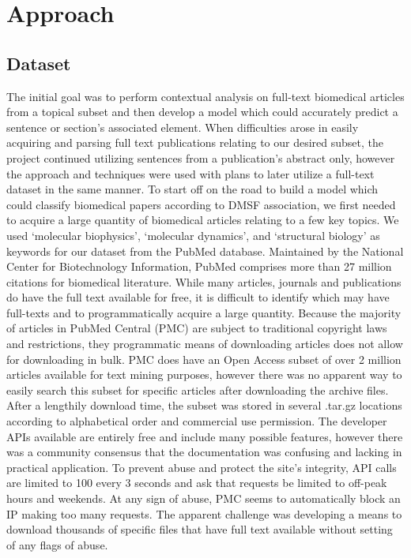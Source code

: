 \documentclass{article} %
\begin{document}
\section{Approach}
\subsection{Dataset}
The initial goal was to perform contextual analysis on full-text biomedical articles from a topical subset and then develop a model which could accurately predict a sentence or section’s associated element. When difficulties arose in easily acquiring and parsing full text publications relating to our desired subset, the project continued utilizing sentences from a publication’s abstract only, however the approach and techniques were used with plans to later utilize a full-text dataset in the same manner. To start off on the road to build a model which could classify biomedical papers according to DMSF association, we first needed to acquire a large quantity of biomedical articles relating to a few key topics. We used ‘molecular biophysics’, ‘molecular dynamics’, and ‘structural biology’ as keywords for our dataset from the PubMed database. Maintained by the National Center for Biotechnology Information, PubMed comprises more than 27 million citations for biomedical literature. While many articles, journals and publications do have the full text available for free, it is difficult to identify which may have full-texts and to programmatically acquire a large quantity. Because the majority of articles in PubMed Central (PMC) are subject to traditional copyright laws and restrictions, they programmatic means of downloading articles does not allow for downloading in bulk. PMC does have an Open Access subset of over 2 million articles available for text mining purposes, however there was no apparent way to easily search this subset for specific articles after downloading the archive files. After a lengthily download time, the subset was stored in several .tar.gz locations according to alphabetical order and commercial use permission. The developer APIs available are entirely free and include many possible features, however there was a community consensus that the documentation was confusing and lacking in practical application. To prevent abuse and protect the site’s integrity, API calls are limited to 100 every 3 seconds and ask that requests be limited to off-peak hours and weekends. At any sign of abuse, PMC seems to automatically block an IP making too many requests. The apparent challenge was developing a means to download thousands of specific files that have full text available without setting of any flags of abuse. 
\end{document}
